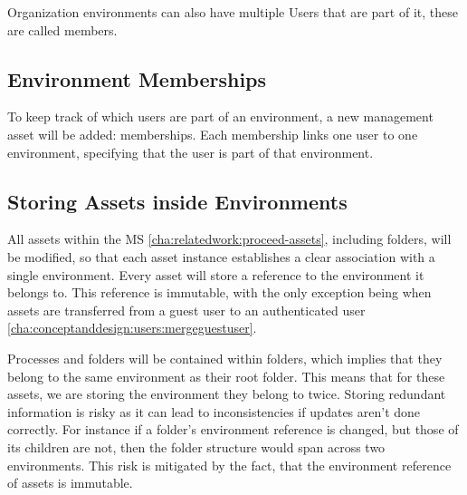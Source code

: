
Organization environments can also have multiple Users that are part of it, these are
called members.

\subsection{Environment Memberships}
\label{cha:conceptanddesign:environments:memberships}

To keep track of which users are part of an environment, a new management asset will be
added: memberships.
Each membership links one user to one environment, specifying that the user is part of
that environment.

\subsection{Storing Assets inside Environments}
\label{cha:conceptanddesign:environments:storing-assets}

All assets within the MS \ref{cha:relatedwork:proceed-assets}, including folders,
will be modified, so that each asset instance establishes a clear association with a single environment.
Every asset will store a reference to the environment it belongs to.
This reference is immutable, with the only exception being when assets are transferred
from a guest user to an authenticated user \ref{cha:conceptanddesign:users:mergeguestuser}.

Processes and folders will be contained within folders, which implies that they belong to
the same environment as their root folder.
This means that for these assets, we are storing the environment they belong to twice.
Storing redundant information is risky as it can lead to inconsistencies if updates aren't
done correctly.
For instance if a folder's environment reference is changed, but those of its children
are not, then the folder structure would span across two environments.
This risk is mitigated by the fact, that the environment reference of assets is immutable.


